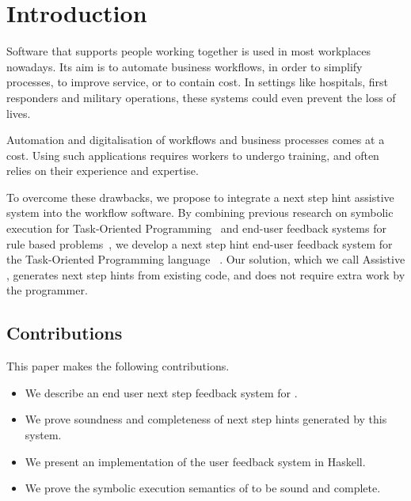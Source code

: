 
\section{Introduction}
\label{sec:intro}

Software that supports people working together is used in most workplaces nowadays.
Its aim is to automate business workflows, in order to simplify processes, to improve service, or to contain cost.
In settings like hospitals, first responders and military operations, these systems could even prevent the loss of lives.


Automation and digitalisation of workflows and business processes comes at a cost.
Using such applications requires workers to undergo training, and often relies on their experience and expertise.

To overcome these drawbacks, we propose to integrate a next step hint assistive system into the workflow software.
By combining previous research on symbolic execution for Task-Oriented Programming~\cite{Naus2019} and end-user feedback systems for rule based problems~\cite{DBLP:conf/sfp/NausJ16},
we develop a next step hint end-user feedback system for the Task-Oriented Programming language \TOPHAT~\cite{DBLP:conf/ppdp/SteenvoordenNK19}.
Our solution, which we call Assistive \TOPHAT, generates next step hints from existing code, and does not require extra work by the programmer.


\subsection{Contributions}

This paper makes the following contributions.

\begin{itemize}
  \item We describe an end user next step feedback system for \TOPHAT.
  \item We prove soundness and completeness of next step hints generated by this system.
  \item We present an implementation of the user feedback system in Haskell.
  \item We prove the symbolic execution semantics of \TOPHAT to be sound and complete.
\end{itemize}


